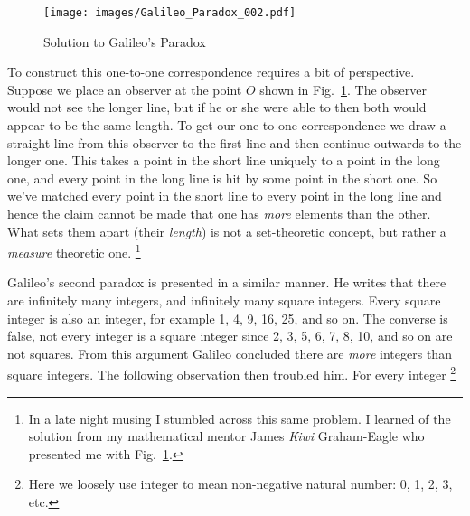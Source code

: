             \begin{figure}[H]
                \centering
                \captionsetup{type=figure}
                \if{}
                    \texttt{[image: images/Galileo\_Paradox\_002.pdf]}
                \fi
                \caption{Solution to Galileo's Paradox}
                \label{fig:Galileo_Paradox_002}
            \end{figure}
            To construct this one-to-one correspondence requires a bit of
            perspective. Suppose we place an observer at the point $O$ shown in
            Fig.~\ref{fig:Galileo_Paradox_002}. The observer would not see the
            longer line, but if he or she were able to then both would appear to
            be the same length. To get our one-to-one correspondence we draw a
            straight line from this observer to the first line and then continue
            outwards to the longer one. This takes a point in the short line
            uniquely to a point in the long one, and every point in the long
            line is hit by some point in the short one. So we've matched every
            point in the short line to every point in the long line and hence
            the claim cannot be made that one has \textit{more} elements than
            the other. What sets them apart (their \textit{length}) is not a
            set-theoretic concept, but rather a \textit{measure} theoretic one.%
            \footnote{%
                In a late night musing I stumbled across this same problem. I
                learned of the solution from my mathematical mentor James
                \textit{Kiwi} Graham-Eagle who presented me with
                Fig.~\ref{fig:Galileo_Paradox_002}.
            }
            \par\hfill\par
            Galileo's second paradox is presented in a similar manner. He writes
            that there are infinitely many integers, and infinitely many square
            integers. Every square integer is also an integer, for example 1, 4,
            9, 16, 25, and so on. The converse is false, not every integer is a
            square integer since 2, 3, 5, 6, 7, 8, 10, and so on are not
            squares. From this argument Galileo concluded there are
            \textit{more} integers than square integers. The following
            observation then troubled him. For every integer%
            \footnote{%
                Here we loosely use integer to mean non-negative natural number:
                0, 1, 2, 3, etc.
            }
